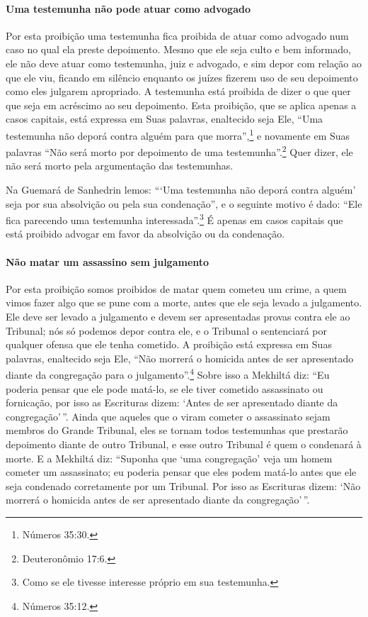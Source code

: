 \paragraph{Uma testemunha não pode atuar como advogado}

Por esta proibição uma testemunha fica proibida de atuar como advogado
num caso no qual ela preste depoimento. Mesmo que ele seja culto e bem
informado, ele não deve atuar como testemunha, juiz e advogado, e sim
depor com relação ao que ele viu, ficando em silêncio enquanto os juízes
fizerem uso de seu depoimento como eles julgarem apropriado. A
testemunha está proibida de dizer o que quer que seja em acréscimo ao
seu depoimento. Esta proibição, que se aplica apenas a casos capitais,
está expressa em Suas palavras, enaltecido seja Ele, ``Uma testemunha
não deporá contra alguém para que morra'',\footnote{Números 35:30.} e novamente
em Suas palavras ``Não será morto por depoimento de uma testemunha''.\footnote{Deuteronômio 17:6.} Quer dizer, ele não será morto pela argumentação
das testemunhas.

Na Guemará de Sanhedrin lemos: ```Uma testemunha não deporá contra
alguém' seja por sua absolvição ou pela sua condenação'', e o seguinte
motivo é dado: ``Ele fica parecendo uma testemunha
interessada''.\footnote{Como se ele tivesse interesse próprio em sua testemunha.}
É apenas em casos capitais que está proibido advogar em favor da
absolvição ou da condenação.

\paragraph{Não matar um assassino sem julgamento}

Por esta proibição somos proibidos de matar quem cometeu um crime, a
quem vimos fazer algo que se pune com a morte, antes que ele seja levado
a julgamento. Ele deve ser levado a julgamento e devem ser apresentadas
provas contra ele ao Tribunal; nós só podemos depor contra ele, e o
Tribunal o sentenciará por qualquer ofensa que ele tenha cometido. A
proibição está expressa em Suas palavras, enaltecido seja Ele, ``Não
morrerá o homicida antes de ser apresentado diante da congregação para
o julgamento''.\footnote{Números 35:12.} Sobre isso a Mekhiltá diz: ``Eu poderia
pensar que ele pode matá-lo, se ele tiver cometido assassinato ou
fornicação, por isso as Escrituras dizem: `Antes de ser apresentado
diante da congregação'\,''. Ainda que aqueles que o viram cometer o
assassinato sejam membros do Grande Tribunal, eles se tornam todos
testemunhas que prestarão depoimento diante de outro Tribunal, e esse
outro Tribunal é quem o condenará à morte. E a Mekhiltá diz: ``Suponha
que `uma congregação' veja um homem cometer um assassinato; eu poderia
pensar que eles podem matá-lo antes que ele seja condenado corretamente
por um Tribunal. Por isso as Escrituras dizem: `Não morrerá o homicida
antes de ser apresentado diante da congregação'\,''.


